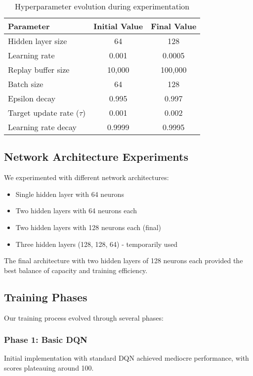 \documentclass[11pt,a4paper]{article}
\begin{document}
\begin{table}[H]
\centering
\begin{tabular}{@{}lcc@{}}
\toprule
\textbf{Parameter} & \textbf{Initial Value} & \textbf{Final Value} \\
\midrule
Hidden layer size & 64 & 128 \\
Learning rate & 0.001 & 0.0005 \\
Replay buffer size & 10,000 & 100,000 \\
Batch size & 64 & 128 \\
Epsilon decay & 0.995 & 0.997 \\
Target update rate ($\tau$) & 0.001 & 0.002 \\
Learning rate decay & 0.9999 & 0.9995 \\
\bottomrule
\end{tabular}
\caption{Hyperparameter evolution during experimentation}
\label{tab:hyperparams}
\end{table}

\subsection{Network Architecture Experiments}

We experimented with different network architectures:
\begin{itemize}
    \item Single hidden layer with 64 neurons
    \item Two hidden layers with 64 neurons each
    \item Two hidden layers with 128 neurons each (final)
    \item Three hidden layers (128, 128, 64) - temporarily used
\end{itemize}

The final architecture with two hidden layers of 128 neurons each provided the best balance of capacity and training efficiency.

\subsection{Training Phases}

Our training process evolved through several phases:

\subsubsection{Phase 1: Basic DQN}
Initial implementation with standard DQN achieved mediocre performance, with scores plateauing around 100.
\end{document}
